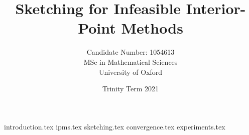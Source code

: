 \documentclass[a4paper, 12pt, egregdoesnotlikesansseriftitles]{scrreprt}
\title{Sketching for Infeasible Interior-Point Methods}
\author{Candidate Number: 1054613 \\[1em] MSc in Mathematical Sciences \\ University of Oxford}
\date{Trinity Term 2021}
\begin{document}
\hypersetup{pageanchor=false}
\maketitle
\hypersetup{pageanchor=true}

\tableofcontents

{introduction.tex}
{ipms.tex}
{sketching.tex}
{convergence.tex}
{experiments.tex}

\printbibliography[heading=bibintoc]
\end{document}
